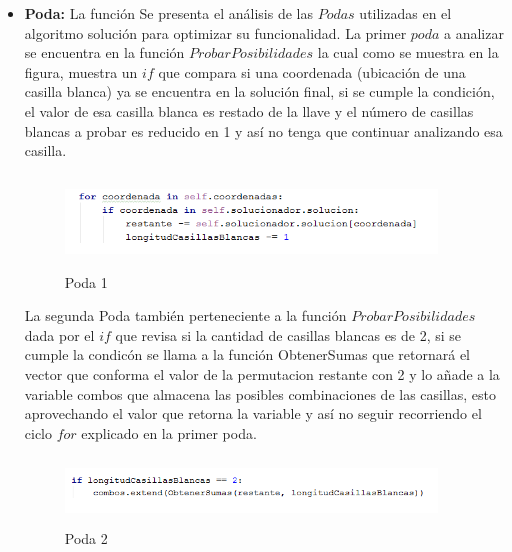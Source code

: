 \documentclass[journal]{IEEEtran}
\begin{document}
	\begin{itemize}
		\item{\bf Poda:} La función Se presenta el análisis de las $Podas$ utilizadas en el algoritmo solución para optimizar su funcionalidad. La primer $poda$ a analizar se encuentra en la función $ProbarPosibilidades$ la cual como se muestra en la figura, muestra un $if$ que compara si una coordenada (ubicación de una casilla blanca) ya se encuentra en la solución final, si se cumple la condición, el valor de esa casilla blanca es restado de la llave y el número de casillas blancas a probar es reducido en 1 y así no tenga que continuar analizando esa casilla. 
		
		
		\begin{figure}[h]
			\centering
			\includegraphics[height= 70pt, width= 280pt]{Poda1.png}
			\caption{Poda 1}
		\end{figure}
	
		La segunda Poda también perteneciente a la función $ProbarPosibilidades$ dada por el $if$ que revisa si la cantidad de casillas blancas es de 2, si se cumple la condicón se llama a la función ObtenerSumas que retornará el vector que conforma el valor de la permutacion restante con 2 y lo añade a la variable combos que almacena las posibles combinaciones de las casillas, esto aprovechando el valor que retorna la variable y así no seguir recorriendo el ciclo $for$ explicado en la primer poda. 
	
		\begin{figure}[h]
			\centering
			\includegraphics[height= 50pt, width=280pt]{Poda2.png}
			\caption{Poda 2}
		\end{figure}
		
						
	\end{itemize}	

	
	
\end{document}
